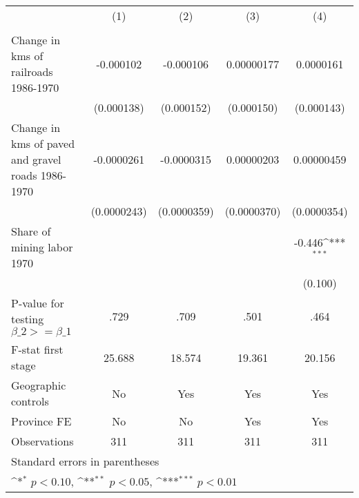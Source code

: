 {
\def\sym#1{\ifmmode^{#1}\else\(^{#1}\)\fi}
\begin{tabular}{l*{4}{c}}
\hline\hline
                &\multicolumn{1}{c}{(1)}&\multicolumn{1}{c}{(2)}&\multicolumn{1}{c}{(3)}&\multicolumn{1}{c}{(4)}\\
                &\multicolumn{1}{c}{}&\multicolumn{1}{c}{}&\multicolumn{1}{c}{}&\multicolumn{1}{c}{}\\
\hline
Change in kms of railroads 1986-1970&-0.000102         &-0.000106         &0.00000177         &0.0000161         \\
                &(0.000138)         &(0.000152)         &(0.000150)         &(0.000143)         \\
[1em]
Change in kms of paved and gravel roads 1986-1970&-0.0000261         &-0.0000315         &0.00000203         &0.00000459         \\
                &(0.0000243)         &(0.0000359)         &(0.0000370)         &(0.0000354)         \\
[1em]
Share of mining labor 1970&                  &                  &                  &   -0.446\sym{***}\\
                &                  &                  &                  &  (0.100)         \\
\hline
P-value for testing $\beta\_{2} >= \beta\_{1}$&     .729         &     .709         &     .501         &     .464         \\
F-stat first stage&   25.688         &   18.574         &   19.361         &   20.156         \\
Geographic controls&       No         &      Yes         &      Yes         &      Yes         \\
Province FE     &       No         &       No         &      Yes         &      Yes         \\
Observations    &      311         &      311         &      311         &      311         \\
\hline\hline
\multicolumn{5}{l}{\footnotesize Standard errors in parentheses}\\
\multicolumn{5}{l}{\footnotesize \sym{*} \(p<0.10\), \sym{**} \(p<0.05\), \sym{***} \(p<0.01\)}\\
\end{tabular}
}
